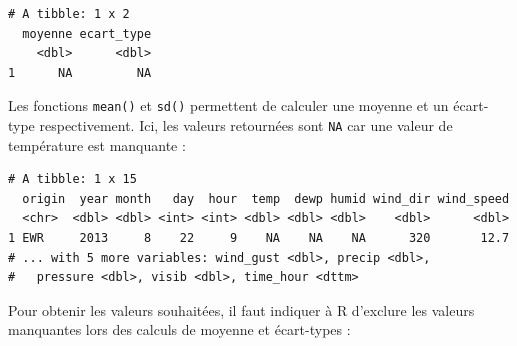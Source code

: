 \documentclass[a4paperpaper,]{article}
\newenvironment{Shaded}{\begin{snugshade}}{\end{snugshade}}
\newcommand{\DataTypeTok}[1]{\textcolor[rgb]{0.00,0.34,0.68}{#1}}
\newcommand{\KeywordTok}[1]{\textcolor[rgb]{0.12,0.11,0.11}{\textbf{#1}}}
\newcommand{\NormalTok}[1]{\textcolor[rgb]{0.12,0.11,0.11}{#1}}
\newcommand{\OperatorTok}[1]{\textcolor[rgb]{0.12,0.11,0.11}{#1}}
\newcommand{\OtherTok}[1]{\textcolor[rgb]{0.00,0.43,0.16}{#1}}
\newcommand{\StringTok}[1]{\textcolor[rgb]{0.75,0.01,0.01}{#1}}
\begin{document}
\begin{Shaded}
\end{Shaded}

\begin{verbatim}
# A tibble: 1 x 2
  moyenne ecart_type
    <dbl>      <dbl>
1      NA         NA
\end{verbatim}

Les fonctions \texttt{mean()} et \texttt{sd()} permettent de calculer une moyenne et un écart-type respectivement. Ici, les valeurs retournées sont \texttt{NA} car une valeur de température est manquante :

\begin{Shaded}
\end{Shaded}

\begin{verbatim}
# A tibble: 1 x 15
  origin  year month   day  hour  temp  dewp humid wind_dir wind_speed
  <chr>  <dbl> <dbl> <int> <int> <dbl> <dbl> <dbl>    <dbl>      <dbl>
1 EWR     2013     8    22     9    NA    NA    NA      320       12.7
# ... with 5 more variables: wind_gust <dbl>, precip <dbl>,
#   pressure <dbl>, visib <dbl>, time_hour <dttm>
\end{verbatim}

Pour obtenir les valeurs souhaitées, il faut indiquer à R d'exclure les valeurs manquantes lors des calculs de moyenne et écart-types :

\begin{Shaded}
\end{Shaded}
\end{document}
